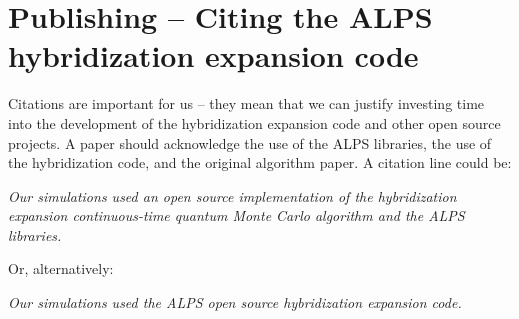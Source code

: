 \documentclass[aps,prb,floatfix,superscriptaddress,twocolumn,notitlepage]{revtex4-1}
\begin{document}
\section{Publishing -- Citing the ALPS hybridization expansion code}
Citations are important for us -- they mean that we can justify investing time into the development of the hybridization expansion code and other open source projects. A paper should acknowledge the use of the ALPS libraries, the use of the hybridization code, and the original algorithm paper. A citation line could be:

{\it
Our simulations used an open source implementation\cite{ALPS_DMFT} of the hybridization expansion continuous-time quantum Monte Carlo algorithm\cite{Werner06} and the ALPS\cite{ALPS20} libraries.
}

Or, alternatively:

{\it
Our simulations used the ALPS open source hybridization expansion code\cite{Werner06,ALPS20,ALPS_DMFT}.
}




\end{document}
